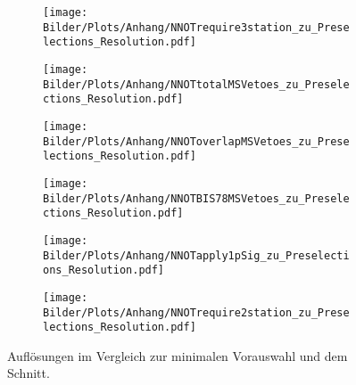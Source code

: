 \begin{figure}
  \begin{subfigure}[t]{0.5\textwidth}
  \texttt{[image: Bilder/Plots/Anhang/NNOTrequire3station\_zu\_Preselections\_Resolution.pdf]}
  \end{subfigure}
\begin{subfigure}[t]{0.5\textwidth}
 \texttt{[image: Bilder/Plots/Anhang/NNOTtotalMSVetoes\_zu\_Preselections\_Resolution.pdf]}
\end{subfigure}
\begin{subfigure}[t]{0.5\textwidth}
  \texttt{[image: Bilder/Plots/Anhang/NNOToverlapMSVetoes\_zu\_Preselections\_Resolution.pdf]}
\end{subfigure}
\begin{subfigure}[t]{0.5\textwidth}
  \texttt{[image: Bilder/Plots/Anhang/NNOTBIS78MSVetoes\_zu\_Preselections\_Resolution.pdf]}
\end{subfigure}
\begin{subfigure}[t]{0.5\textwidth}
  \texttt{[image: Bilder/Plots/Anhang/NNOTapply1pSig\_zu\_Preselections\_Resolution.pdf]}
\end{subfigure}
\begin{subfigure}[t]{0.5\textwidth}
  \texttt{[image: Bilder/Plots/Anhang/NNOTrequire2station\_zu\_Preselections\_Resolution.pdf]}
\end{subfigure}
\caption{Auflösungen im Vergleich zur minimalen Vorauswahl und dem Schnitt.}
\end{figure}
%
%
%
%
%
%
%
%
%
%
%
%
\listoffigures
{}%
\listoftables
{}%


